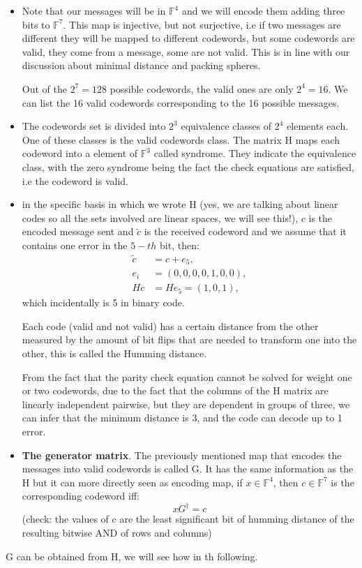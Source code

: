 \begin{itemize}
	\item Note that our messages will be in $\mathbb{F}^4$ and we will encode them adding three bits to $\mathbb{F}^7$. This map is injective, but not surjective, i.e if two messages are different they will be mapped to different codewords, but some codewords are valid, they come from a message, some are not valid. This is in line with our discussion about minimal distance and packing spheres.

	Out of the $2^7=128$ possible codewords, the valid ones are only $2^4=16$. We can list the 16 valid codewords corresponding to the 16 possible messages.

	\item The codewords set is divided into $2^3$ equivalence classes of $2^4$ elements each. One of these classes is the valid codewords class. The matrix H maps each codeword into a element of $\mathbb{F}^3$ called syndrome. They indicate the equivalence class, with the zero syndrome being the fact the check equations are satisfied, i.e the codeword is valid.
	\item in the specific basis in which we wrote H (yes, we are talking about linear codes so all the sets involved are linear spaces, we will see this!), $c$ is the encoded message sent and $\tilde{c}$ is the received codeword and we assume that it contains one error in the $5-th$ bit, then:
	\begin{equation}
	\begin{split}
	\tilde{c} &= c + e_5, \\
	e_i &= (0, 0, 0, 0, 1, 0, 0), \\
	Hc &= He_5 = (1, 0, 1),
	\end{split}
	\end{equation}
which incidentally is 5 in binary code.

Each code (valid and not valid) has a certain distance from the other measured by the amount of bit flips that are needed to transform one into the other, this is called the Humming distance. 

From the fact that the parity check equation cannot be solved for weight one or two codewords, due to the fact that the columns of the H matrix are linearly independent pairwise, but they are dependent in groups of three, we can infer that the minimum distance is 3, and the code can decode up to 1 error.

 \item \textbf{The generator matrix}. The previously mentioned map that encodes the messages into valid codewords is called G. It has the same information as the H but it can more directly seen as encoding map, if $x \in \mathbb{F}^4$, then $c \in \mathbb{F}^7$ is the corresponding codeword iff:
 \begin{equation}
	 x G^\dagger=c
 \end{equation}
(check: the values of c are the least significant bit of humming distance of the resulting bitwise AND of rows and columns)
\end{itemize}
G can be obtained from H, we will see how in th following.


